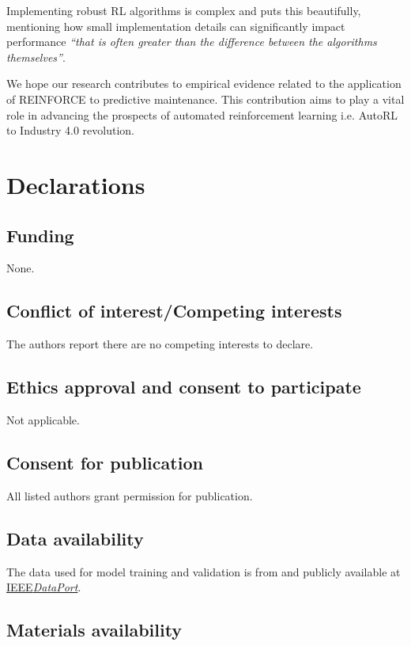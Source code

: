 \documentclass[referee, sn-mathphys-num]{sn-jnl}
\begin{document}
	Implementing robust RL algorithms is complex and \cite{SB3-paper} puts this beautifully, mentioning how small implementation details can significantly impact performance \textit{``that is often greater than the difference between the algorithms themselves''}. 
	
	We hope our research contributes to empirical evidence related to the application of REINFORCE to predictive maintenance. This contribution aims to play a vital role in advancing the prospects of automated reinforcement learning i.e. AutoRL to Industry 4.0 revolution.
	
	\backmatter
	
	
	
	\section*{Declarations}
	
	\subsection*{Funding}
	None.
	\subsection*{Conflict of interest/Competing interests}
	The authors report there are no competing interests to declare.
	
	\subsection*{Ethics approval and consent to participate}
	Not applicable.
	
	\subsection*{Consent for publication}
	All listed authors grant permission for publication.
	
	\subsection*{Data availability}
	The data used for model training and validation is from \cite{PHM-dataset} and publicly available at \href{https://doi.org/10.21227/jdxd-yy51}{IEEE\textit{DataPort}}. 
	
	\subsection*{Materials availability}
\end{document}

